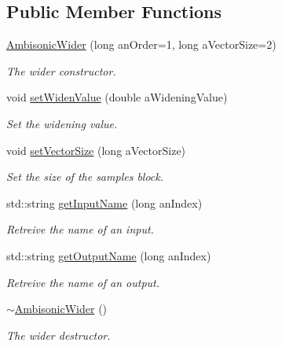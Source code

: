 \subsection*{Public Member Functions}
\begin{DoxyCompactItemize}
\item 
\hyperlink{class_ambisonic_wider_a8e46f8e6bc4eda1c6c17f632d2e1a12f}{Ambisonic\-Wider} (long an\-Order=1, long a\-Vector\-Size=2)
\begin{DoxyCompactList}\small\item\em The wider constructor. \end{DoxyCompactList}\item 
void \hyperlink{class_ambisonic_wider_a26597b62bcb8d892591ad5362702edca}{set\-Widen\-Value} (double a\-Widening\-Value)
\begin{DoxyCompactList}\small\item\em Set the widening value. \end{DoxyCompactList}\item 
void \hyperlink{class_ambisonic_wider_af970c4c71f96afa96649d9c1a1387043}{set\-Vector\-Size} (long a\-Vector\-Size)
\begin{DoxyCompactList}\small\item\em Set the size of the samples block. \end{DoxyCompactList}\item 
std\-::string \hyperlink{class_ambisonic_wider_a405f99a0427aa56d945acbe7f1a09582}{get\-Input\-Name} (long an\-Index)
\begin{DoxyCompactList}\small\item\em Retreive the name of an input. \end{DoxyCompactList}\item 
std\-::string \hyperlink{class_ambisonic_wider_a5c5c88a09477812991122b290117faf9}{get\-Output\-Name} (long an\-Index)
\begin{DoxyCompactList}\small\item\em Retreive the name of an output. \end{DoxyCompactList}\item 
\hypertarget{class_ambisonic_wider_a98b370684ad2cc2d1bdf75add135f1c7}{\hyperlink{class_ambisonic_wider_a98b370684ad2cc2d1bdf75add135f1c7}{$\sim$\-Ambisonic\-Wider} ()}\label{class_ambisonic_wider_a98b370684ad2cc2d1bdf75add135f1c7}

\begin{DoxyCompactList}\small\item\em The wider destructor. \end{DoxyCompactList}\end{DoxyCompactItemize}


